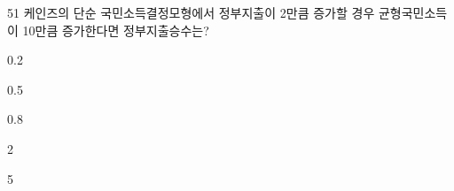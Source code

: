 \begin{question}{51}
케인즈의 단순 국민소득결정모형에서 정부지출이 2만큼 증가할 경우 균형국민소득이 10만큼 증가한다면 정부지출승수는?
\begin{choices}
  \item 0.2
  \item 0.5
  \item 0.8
  \item 2
  \item 5
\end{choices}
\end{question}
